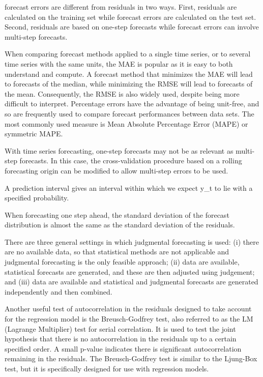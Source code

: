 \documentclass[]{book}
\begin{document}
forecast errors are different from residuals in two ways. First, residuals are calculated on the training set while forecast errors are calculated on the test set. Second, residuals are based on one-step forecasts while forecast errors can involve multi-step forecasts.

When comparing forecast methods applied to a single time series, or to several time series with the same units, the MAE is popular as it is easy to both understand and compute. A forecast method that minimizes the MAE will lead to forecasts of the median, while minimizing the RMSE will lead to forecasts of the mean. Consequently, the RMSE is also widely used, despite being more difficult to interpret. Percentage errors have the advantage of being unit-free, and so are frequently used to compare forecast performances between data sets. The most commonly used measure is Mean Absolute Percentage Error (MAPE) or symmetric MAPE.

With time series forecasting, one-step forecasts may not be as relevant as multi-step forecasts. In this case, the cross-validation procedure based on a rolling forecasting origin can be modified to allow multi-step errors to be used.

A prediction interval gives an interval within which we expect y\_t to lie with a specified probability.

When forecasting one step ahead, the standard deviation of the forecast distribution is almost the same as the standard deviation of the residuals.

There are three general settings in which judgmental forecasting is used: (i) there are no available data, so that statistical methods are not applicable and judgmental forecasting is the only feasible approach; (ii) data are available, statistical forecasts are generated, and these are then adjusted using judgement; and (iii) data are available and statistical and judgmental forecasts are generated independently and then combined.

Another useful test of autocorrelation in the residuals designed to take account for the regression model is the Breusch-Godfrey test, also referred to as the LM (Lagrange Multiplier) test for serial correlation. It is used to test the joint hypothesis that there is no autocorrelation in the residuals up to a certain specified order. A small p-value indicates there is significant autocorrelation remaining in the residuals. The Breusch-Godfrey test is similar to the Ljung-Box test, but it is specifically designed for use with regression models.
\end{document}
